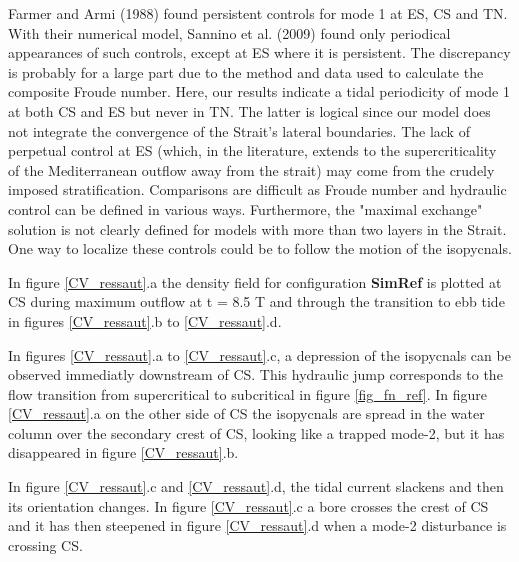 \documentclass[a4paper,12pt]{article}
\begin{document}
Farmer and Armi (1988) found persistent controls for mode 1 at ES, CS and TN. With their numerical model, Sannino et al. (2009) found only periodical appearances of such controls, except at ES where it is persistent. The discrepancy is probably for a large part due to the method and data used to calculate the composite Froude number. Here, our results indicate a tidal periodicity of mode 1 at both CS and ES but never in TN. The latter is logical since our model does not integrate the convergence of the Strait's lateral boundaries. The lack of perpetual control at ES (which, in the literature, extends to the supercriticality of the Mediterranean outflow away from the strait) may come from the crudely imposed stratification. 
Comparisons are difficult as Froude number and hydraulic control can be defined in various ways. Furthermore, the "maximal exchange" solution is not clearly defined for models with more than two layers in the Strait. One way to localize these controls could be to follow the motion of the isopycnals.

In figure \ref{CV_ressaut}.a the density field for configuration \textbf{SimRef} is plotted at CS during maximum outflow at t = 8.5 T and through the transition to ebb tide in figures \ref{CV_ressaut}.b to \ref{CV_ressaut}.d.

In figures \ref{CV_ressaut}.a to \ref{CV_ressaut}.c, a depression of the isopycnals can be observed immediatly downstream of CS. This hydraulic jump corresponds to the flow transition from supercritical to subcritical in figure \ref{fig_fn_ref}. In figure \ref{CV_ressaut}.a on the other side of CS the isopycnals are spread in the water column over the secondary crest of CS, looking like a trapped mode-2, but it has disappeared in figure \ref{CV_ressaut}.b.

In figure \ref{CV_ressaut}.c and \ref{CV_ressaut}.d, the tidal current slackens and then its orientation changes. In figure \ref{CV_ressaut}.c a bore crosses the crest of CS and it has then steepened in figure \ref{CV_ressaut}.d when a mode-2 disturbance is crossing CS.%
\end{document}
